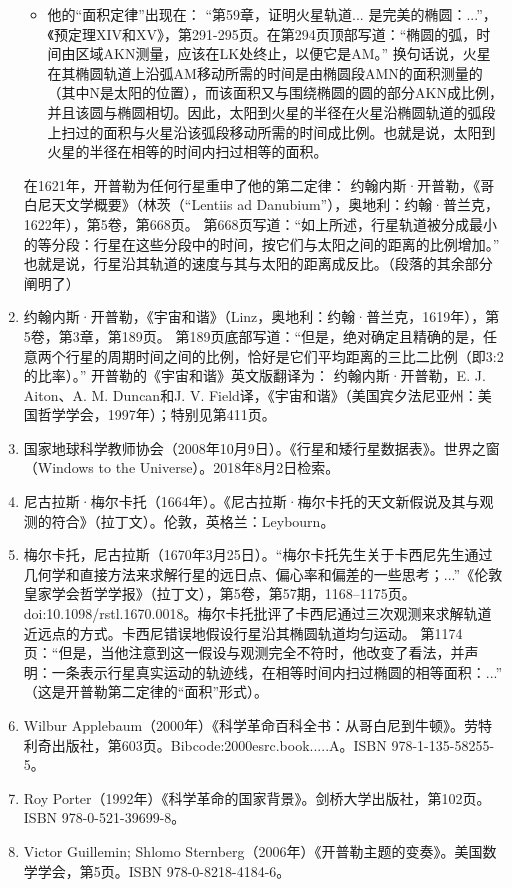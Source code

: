 \begin{enumerate}
\begin{itemize}
\item 他的“面积定律”出现在：  
“第59章，证明火星轨道... 是完美的椭圆：...”，《预定理XIV和XV》，第291-295页。在第294页顶部写道：“椭圆的弧，时间由区域AKN测量，应该在LK处终止，以便它是AM。”  
换句话说，火星在其椭圆轨道上沿弧AM移动所需的时间是由椭圆段AMN的面积测量的（其中N是太阳的位置），而该面积又与围绕椭圆的圆的部分AKN成比例，并且该圆与椭圆相切。因此，太阳到火星的半径在火星沿椭圆轨道的弧段上扫过的面积与火星沿该弧段移动所需的时间成比例。也就是说，太阳到火星的半径在相等的时间内扫过相等的面积。
\end{itemize}
在1621年，开普勒为任何行星重申了他的第二定律：  
约翰内斯·开普勒，《哥白尼天文学概要》（林茨（“Lentiis ad Danubium”），奥地利：约翰·普兰克，1622年），第5卷，第668页。  
第668页写道：“如上所述，行星轨道被分成最小的等分段：行星在这些分段中的时间，按它们与太阳之间的距离的比例增加。”  
也就是说，行星沿其轨道的速度与其与太阳的距离成反比。（段落的其余部分阐明了）  
\item 约翰内斯·开普勒，《宇宙和谐》（Linz，奥地利：约翰·普兰克，1619年），第5卷，第3章，第189页。  
第189页底部写道：“但是，绝对确定且精确的是，任意两个行星的周期时间之间的比例，恰好是它们平均距离的三比二比例（即3:2的比率）。”  
开普勒的《宇宙和谐》英文版翻译为：  
约翰内斯·开普勒，E. J. Aiton、A. M. Duncan和J. V. Field译，《宇宙和谐》（美国宾夕法尼亚州：美国哲学学会，1997年）；特别见第411页。
\item 国家地球科学教师协会（2008年10月9日）。《行星和矮行星数据表》。世界之窗（Windows to the Universe）。2018年8月2日检索。
\item 尼古拉斯·梅尔卡托（1664年）。《尼古拉斯·梅尔卡托的天文新假说及其与观测的符合》（拉丁文）。伦敦，英格兰：Leybourn。
\item 梅尔卡托，尼古拉斯（1670年3月25日）。“梅尔卡托先生关于卡西尼先生通过几何学和直接方法来求解行星的远日点、偏心率和偏差的一些思考；...”《伦敦皇家学会哲学学报》（拉丁文），第5卷，第57期，1168–1175页。doi:10.1098/rstl.1670.0018。梅尔卡托批评了卡西尼通过三次观测来求解轨道近远点的方式。卡西尼错误地假设行星沿其椭圆轨道均匀运动。  
第1174页：“但是，当他注意到这一假设与观测完全不符时，他改变了看法，并声明：一条表示行星真实运动的轨迹线，在相等时间内扫过椭圆的相等面积：...”  （这是开普勒第二定律的“面积”形式）。
\item Wilbur Applebaum（2000年）《科学革命百科全书：从哥白尼到牛顿》。劳特利奇出版社，第603页。Bibcode:2000esrc.book.....A。ISBN 978-1-135-58255-5。
\item Roy Porter（1992年）《科学革命的国家背景》。剑桥大学出版社，第102页。ISBN 978-0-521-39699-8。
\item Victor Guillemin; Shlomo Sternberg（2006年）《开普勒主题的变奏》。美国数学学会，第5页。ISBN 978-0-8218-4184-6。

\end{enumerate}
